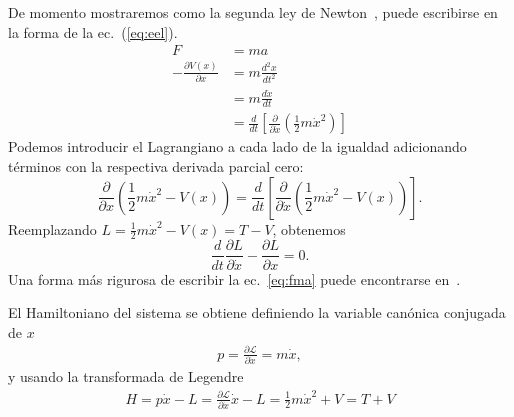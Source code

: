 De momento mostraremos como la segunda ley de Newton~\cite{NewtonSeconLaw}, puede escribirse en la forma de la ec.~(\ref{eq:eel}).
\begin{align}
\label{eq:fma}
  F&=ma\\
  -\frac{\partial V(x)}{\partial x}&=m\frac{d^2x}{dt^2}\nonumber\\
  &=m\frac{d\dot{x}}{dt}\nonumber\\
  &=\frac{d}{dt}
  \left[
    \frac{\partial}{\partial\dot{x}}
    \left(
      \frac{1}{2}m\dot{x}^2
    \right)
  \right]\nonumber
\end{align}
Podemos introducir el Lagrangiano a cada lado de la igualdad adicionando t\'erminos con la respectiva derivada parcial cero:
\begin{equation*}
  \frac{\partial}{\partial x}
  \left(
\frac{1}{2}m\dot{x}^2-V(x)
  \right)=\frac{d}{dt}
  \left[
    \frac{\partial}{\partial\dot{x}}
    \left(
      \frac{1}{2}m\dot{x}^2-V(x)
    \right)
  \right].
\end{equation*}
Reemplazando $L=\frac{1}{2}m\dot{x}^2-V(x)=T-V$, obtenemos
\begin{equation*}
\frac{d}{dt}\frac{\partial L}{\partial\dot{x}}  -\frac{\partial L}{\partial x}=0.
\end{equation*}
Una forma m\'as rigurosa de escribir la ec.~\eqref{eq:fma} puede encontrarse en~\cite{ActionPhysics}. 

El Hamiltoniano del sistema se obtiene definiendo la variable can\'onica conjugada de $x$
\begin{align}
  p=\frac{\partial\mathcal{L}}{\partial\dot{x}}=m \dot{x},
\end{align}
y usando la transformada de Legendre
\begin{align}
  H=p \dot{x}-L=\frac{\partial\mathcal{L}}{\partial\dot{x}}\dot{x}-L=\frac{1}{2}m\dot{x}^2+V=T+V
\end{align}

